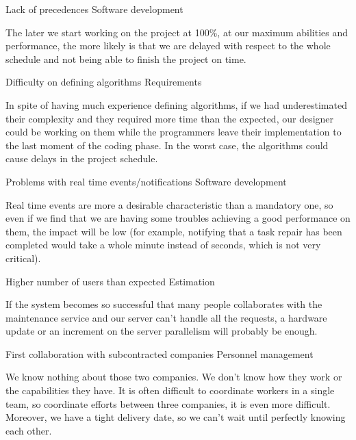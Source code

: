 \begin{risk}[riskPrec]{Lack of precedences}
\riskcat Software development

The later we start working on the project at 100\%, at our maximum abilities and performance, the more likely is that we are delayed with respect to the whole schedule and not being able to finish the project on time.
\end{risk}

\begin{risk}[riskAlgorithms]{Difficulty on defining algorithms}
\riskcat Requirements

In spite of having much experience defining algorithms, if we had underestimated their complexity and they required more time than the expected, our designer could be working on them while the programmers leave their implementation to the last moment of the coding phase. In the worst case, the algorithms could cause delays in the project schedule.
\end{risk}

\begin{risk}[riskRealTime]{Problems with real time events/notifications}
\riskcat Software development

Real time events are more a desirable characteristic than a mandatory one, so even if we find that we are having some troubles achieving a good performance on them, the impact will be low (for example, notifying that a task repair has been completed would take a whole minute instead of seconds, which is not very critical).
\end{risk}

\begin{risk}[riskUserLoad]{Higher number of users than expected}
\riskcat Estimation

If the system becomes so successful that many people collaborates with the maintenance service and our server can't handle all the requests, a hardware update or an increment on the server parallelism will probably be enough.
\end{risk}

\begin{risk}[riskCollaboration]{First collaboration with subcontracted companies}
\riskcat Personnel management

We know nothing about those two companies. We don't know how they work or the capabilities they have. It is often difficult to coordinate workers in a single team, so coordinate efforts between three companies, it is even more difficult. Moreover, we have a tight delivery date, so we can't wait until perfectly knowing each other.
\end{risk}

